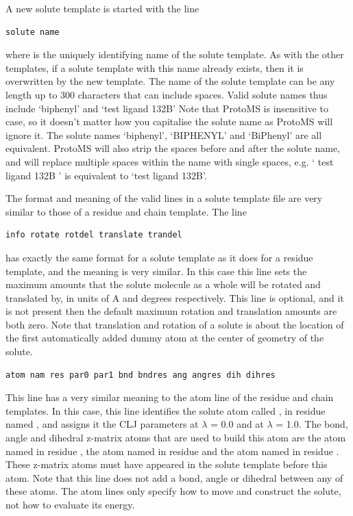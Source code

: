 \documentclass[letterpaper,10pt,english]{sphinxmanual}
\begin{document}
A new solute template is started with the line

\begin{Verbatim}[commandchars=\\\{\}]
solute name
\end{Verbatim}

where  is the uniquely identifying name of the solute template. As with the other templates, if a solute template with this name already exists, then it is overwritten by the new template. The name of the solute template can be any length up to 300 characters that can include spaces. Valid solute names thus include ‘biphenyl’ and ‘test ligand 132B’ Note that ProtoMS is insensitive to case, so it doesn’t matter how you capitalise the solute name as ProtoMS will ignore it. The solute names ‘biphenyl’, ‘BIPHENYL’ and ‘BiPhenyl’ are all equivalent. ProtoMS will also strip the spaces before and after the solute name, and will replace multiple spaces within the name with single spaces, e.g. ‘ test ligand 132B ’ is equivalent to ‘test ligand 132B’.

The format and meaning of the valid lines in a solute template file are very similar to those of a residue and chain template. The line

\begin{Verbatim}[commandchars=\\\{\}]
info rotate rotdel translate trandel
\end{Verbatim}

has exactly the same format for a solute template as it does for a residue template, and the meaning is very similar. In this case this line sets the maximum amounts that the solute molecule as a whole will be rotated and translated by, in units of A and degrees respectively. This line is optional, and it is not present then the default maximum rotation and translation amounts are both zero. Note that translation and rotation of a solute is about the location of the first automatically added dummy atom at the center of geometry of the solute.

\begin{Verbatim}[commandchars=\\\{\}]
atom nam res par0 par1 bnd bndres ang angres dih dihres
\end{Verbatim}

This line has a very similar meaning to the atom line of the residue and chain templates. In this case, this line identifies the solute atom called , in residue named , and assigns it the CLJ parameters  at \(\lambda\) = 0.0 and  at \(\lambda\) = 1.0. The bond, angle and dihedral z-matrix atoms that are used to build this atom are the atom named  in residue , the atom named  in residue  and the atom named  in residue . These z-matrix atoms must have appeared in the solute template before this atom. Note that this line does not add a bond, angle or dihedral between any of these atoms. The atom lines only specify how to move and construct the solute, not how to evaluate its energy.
\end{document}
